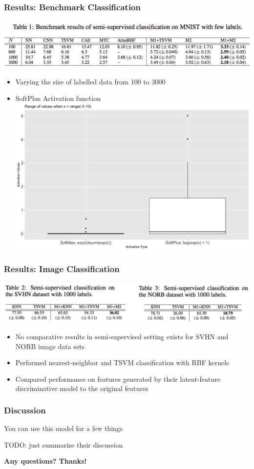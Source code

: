 \documentclass{beamer}
\begin{document}
\begin{frame}
  \frametitle{Results: Benchmark Classification}

  \includegraphics[scale=0.5]{table1}

  \begin{itemize}
  \item Varying the size of labelled data from 100 to 3000
  \item SoftPlus Activation function
    \includegraphics[scale=0.05]{activations}
    \end{itemize}
  
\end{frame}
\begin{frame}
  \frametitle{Results: Image Classification}

  \includegraphics[scale=0.5]{table2and3}

  \begin{itemize}
  \item No comparative results in semi-supervised setting exists for
    SVHN and NORB image data sets
  \item Performed nearest-neighbor and TSVM classification with RBF
    kernels
  \item Compared performance on features generated by their latent-feature
    discriminative model to the original features
    \end{itemize}

\end{frame}

\begin{frame}
  \frametitle{Discussion}

  You can use this model for a few things

  TODO: just summarize their discussion
\end{frame}

\begin{frame}
  \textbf{Any questions? Thanks!}
  \end{frame}


 
\end{document}
